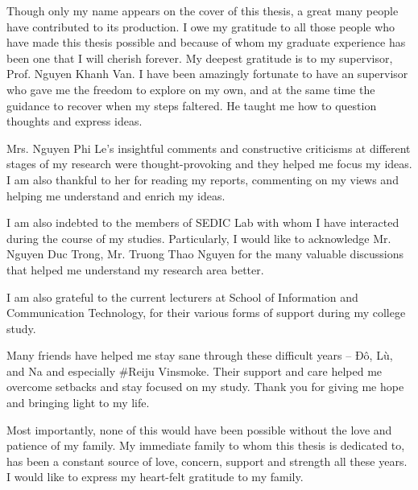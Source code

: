 \begin{acknowledgements}      

Though only my name appears on the cover of this thesis, a great many people have contributed to its production. I owe my gratitude to all those people who have made this thesis possible and because of whom my graduate experience has been one that I will cherish forever.
My deepest gratitude is to my supervisor, Prof. Nguyen Khanh Van. I have been amazingly fortunate to have an supervisor who gave me the freedom to explore on my own, and at the same time the guidance to recover when my steps faltered. He taught me how to question thoughts and express ideas.

Mrs. Nguyen Phi Le's insightful comments and constructive criticisms at different stages of my research were thought-provoking and they helped me focus my ideas. I am also thankful to her for reading my reports, commenting on my views and helping me understand and enrich my ideas.

I am also indebted to the members of SEDIC Lab with whom I have interacted during the course of my studies. Particularly, I would like to acknowledge Mr. Nguyen Duc Trong, Mr. Truong Thao Nguyen for the many valuable discussions that helped me understand my research area better.

I am also grateful to the current lecturers at School of Information and Communication Technology, for their various forms of support during my college study.

Many friends have helped me stay sane through these difficult years -- Đô, Lù, and Na and especially \#Reiju Vinsmoke. Their support and care helped me overcome setbacks and stay focused on my study. Thank you for giving me hope and bringing light to my life.

Most importantly, none of this would have been possible without the love and patience of my family. My immediate family to whom this thesis is dedicated to, has been a constant source of love, concern, support and strength all these years. I would like to express my heart-felt gratitude to my family.

\end{acknowledgements}
  